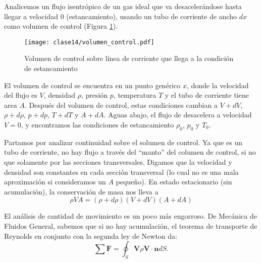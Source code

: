 Analicemos un flujo isentrópico de un gas ideal que va desacelerándose hasta llegar a velocidad 0 (estancamiento), usando un tubo de corriente de ancho $dx$ como volumen de control (Figura \ref{fig:volumen_control}).
%
\begin{figure}
\centering
\texttt{[image: clase14/volumen\_control.pdf]}
\caption{Volumen de control sobre línea de corriente que llega a la condición de estancamiento}
\label{fig:volumen_control}
\end{figure}
%
El volumen de control se encuentra en un punto genérico $x$, donde la velocidad del flujo es $V$, densidad $\rho$, presión $p$, temperatura $T$ y el tubo de corriente tiene area $A$. 
Después del volumen de control, estas condiciones cambian a $V+dV$, $\rho+d\rho$, $p+dp$, $T+dT$ y $A+dA$.
Aguas abajo, el flujo de desacelera a velocidad $V=0$, y encontramos las condiciones de estancamiento $\rho_0$, $p_0$ y $T_0$.

Partamos por analizar continuidad sobre el solumen de control.
Ya que es un tubo de corriente, no hay flujo a través del ``manto'' del columen de control, si no que solamente por las secciones transversales.
Digamos que la velocidad y densidad son constantes en cada sección transversal (lo cual no es una mala aproximación si consideramos un $A$ pequeño).
En estado estacionario (sin acumulación), la conservación de masa nos lleva a
%
\begin{equation}\label{eq:continuidad_isentropico}
\rho VA = (\rho+d\rho)(V+dV)(A+dA)
\end{equation}

El análisis de cantidad de movimiento es un poco más engorroso.
De Mecánica de Fluidos General, sabemos que si no hay acumulación, el teorema de transporte de Reynolds en conjunto con la segunda ley de Newton da:
%
\begin{equation}\label{eq:momentum_isentropico}
\sum \mathbf{F} = \oint_S \mathbf{V} \rho \mathbf{V}\cdot\mathbf{n} dS.
\end{equation}

